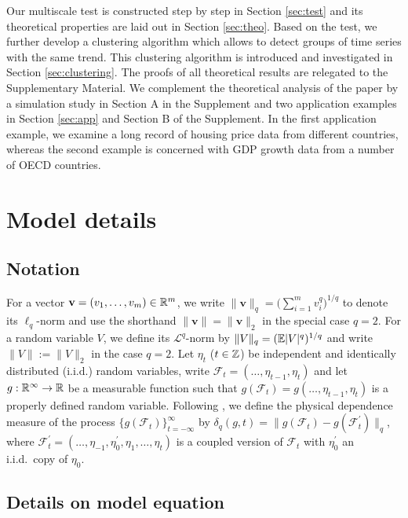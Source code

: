 \documentclass[12pt]{article}
\makeatletter
\renewcommand{\eqref}[1]{\tagform@{\ref{#1}}}
\makeatother
\begin{document}
Our multiscale test is constructed step by step in Section \ref{sec:test} and its theoretical properties are laid out in Section \ref{sec:theo}. Based on the test, we further develop a clustering algorithm which allows to detect groups of time series with the same trend. This clustering algorithm is introduced and investigated in Section \ref{sec:clustering}. The proofs of all theoretical results are relegated to the Supplementary Material. We complement the theoretical analysis of the paper by a simulation study in Section A in the Supplement and two application examples in Section \ref{sec:app} and Section B of the Supplement. In the first application example, we examine a long record of housing price data from different countries, whereas the second example is concerned with GDP growth data from a number of OECD countries. 



\section{Model details}\label{sec:model}


\subsection{Notation}\label{subsec:model_notation}


For a vector $\mathbf{v} = (v_1, \ldots, v_m)\in\mathbb{R}^m$, we write $\|\mathbf{v}\|_q = \big(\sum_{i=1}^m v_i^q\big)^{1/q}$ to denote its $\ell_q$-norm and use the shorthand $\|\mathbf{v}\| = \|\mathbf{v}\|_2$ in the special case $q = 2$. For a random variable $V$, we define its $\mathcal{L}^q$-norm by $\|V\|_q = (\mathbb{E} |V|^q)^{1/q}$ and write $\|V\| := \|V\|_2$ in the case $q = 2$.
Let $\eta_t$ ($t \in \mathbb{Z}$) be independent and identically distributed ($\text{i.i.d.}$) random variables, write $\mathcal{F}_t  = (\ldots, \eta_{t-1}, \eta_t)$ and let $g: \mathbb{R}^\infty \to \mathbb{R}$ be a measurable function such that $g(\mathcal{F}_t) = g(\ldots, \eta_{t-1}, \eta_t)$ is a properly defined random variable. Following \cite{Wu2005}, we define the physical dependence measure of the process $\{g(\mathcal{F}_t)\}_{t=-\infty}^\infty$ by $\delta_q(g, t) = \| g(\mathcal{F}_t) - g(\mathcal{F}_t^\prime) \|_q$, where $\mathcal{F}_t^\prime  = (\ldots, \eta_{-1}, \eta^\prime_0, \eta_1, \ldots, \eta_t)$ is a coupled version of $\mathcal{F}_t$ with $\eta_0^\prime$ an i.i.d.\ copy of $\eta_0$. 


\subsection{Details on model equation \eqref{eq:model_full}}\label{subsec:model_setting}
\end{document}
